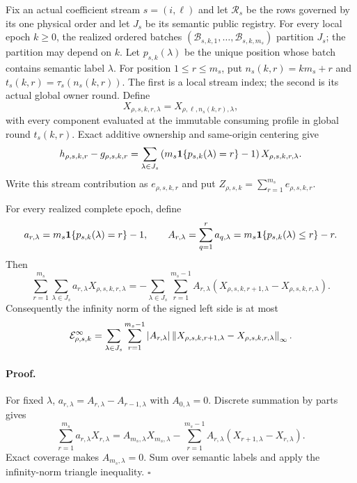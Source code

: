 Fix an actual coefficient stream $s=(i,\ell)$ and let
$\mathcal R_s$ be the rows governed by its one physical order and let $J_s$
be its semantic public registry.  For every local epoch $k\ge0$, the realized
ordered batches
$(\mathcal B_{s,k,1},\ldots,\mathcal B_{s,k,m_s})$ partition $J_s$; the
partition may depend on $k$.  Let $p_{s,k}(\lambda)$ be the unique position
whose batch contains semantic label $\lambda$.  For position
$1\le r\le m_s$, put
$n_s(k,r)=km_s+r$ and $t_s(k,r)=\tau_s(n_s(k,r))$.  The first is a local
stream index; the second is its actual global owner round.  Define
\begin{equation}
X_{\rho,s,k,r,\lambda}
=X_{\rho,\ell,n_s(k,r),\lambda},
\label{eq:app-batch-component}
\end{equation}
with every component evaluated at the immutable consuming profile in global
round $t_s(k,r)$.
Exact additive ownership and same-origin centering give
\begin{equation}
h_{\rho,s,k,r}-g_{\rho,s,k,r}
=\sum_{\lambda\in J_s}
\left(m_s\mathbf 1\{p_{s,k}(\lambda)=r\}-1\right)
X_{\rho,s,k,r,\lambda}.
\label{eq:app-batch-semantic-interface}
\end{equation}
Write this stream contribution as $e_{\rho,s,k,r}$ and put
$Z_{\rho,s,k}=\sum_{r=1}^{m_s}e_{\rho,s,k,r}$.

\begin{lemma}
\label{lem:app-deadline-variation}
For every realized complete epoch, define
\begin{equation}
a_{r,\lambda}=m_s\mathbf 1\{p_{s,k}(\lambda)=r\}-1,\qquad
A_{r,\lambda}=\sum_{q=1}^r a_{q,\lambda}
=m_s\mathbf 1\{p_{s,k}(\lambda)\le r\}-r .
\end{equation}
Then
\begin{equation}
\sum_{r=1}^{m_s}\sum_{\lambda\in J_s}
a_{r,\lambda}X_{\rho,s,k,r,\lambda}
=-\sum_{\lambda\in J_s}\sum_{r=1}^{m_s-1}
A_{r,\lambda}(X_{\rho,s,k,r+1,\lambda}
-X_{\rho,s,k,r,\lambda}).
\label{eq:app-deadline-variation-identity}
\end{equation}
Consequently the infinity norm of the signed left side is at most
\begin{equation}
\mathcal E_{\rho,s,k}^\infty
=\sum_{\lambda\in J_s}\sum_{r=1}^{m_s-1}|A_{r,\lambda}|
\left\lVert X_{\rho,s,k,r+1,\lambda}
-X_{\rho,s,k,r,\lambda} \right\rVert_\infty .
\label{eq:app-deadline-variation-debit}
\end{equation}
\end{lemma}

\paragraph{Proof.}
For fixed $\lambda$, $a_{r,\lambda}=A_{r,\lambda}-A_{r-1,\lambda}$
with $A_{0,\lambda}=0$.
Discrete summation by parts gives
\begin{equation}
\sum_{r=1}^{m_s}a_{r,\lambda}X_{r,\lambda}
=A_{m_s,\lambda}X_{m_s,\lambda}
-\sum_{r=1}^{m_s-1}A_{r,\lambda}
(X_{r+1,\lambda}-X_{r,\lambda}).
\end{equation}
Exact coverage makes $A_{m_s,\lambda}=0$.  Sum over semantic labels and apply the
infinity-norm triangle inequality. \hfill$\square$


